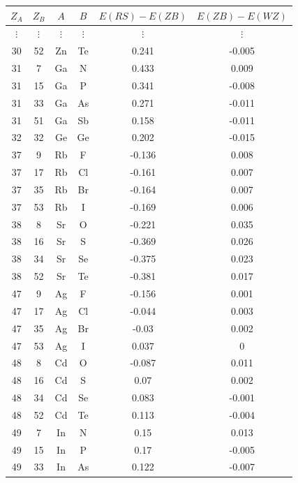 \documentclass[11pt,oneside,czech,american]{book} %
\theoremstyle{plain}
\theoremstyle{definition}
\begin{document}
\begin{table}
\begin{minipage}{0.5\textwidth}
	\end{minipage} \hfill
	\begin{minipage}{0.5\textwidth}
		\begin{tabular}{cccccc}
			\toprule
			$Z_A$ &   $Z_B$ & $A$   & $B$   &      $E(RS) - E(ZB)$ &     $E(ZB)-E(WZ)$ \\
			\midrule
			$\vdots$ & $\vdots$ & $\vdots$ & $\vdots$ & $\vdots$ & $\vdots$  \\ 
			30 &    52 & Zn  & Te  &  0.241 & -0.005 \\
			31 &     7 & Ga  & N   &  0.433 &  0.009 \\
			31 &    15 & Ga  & P   &  0.341 & -0.008 \\
			31 &    33 & Ga  & As  &  0.271 & -0.011 \\
			31 &    51 & Ga  & Sb  &  0.158 & -0.011 \\
			32 &    32 & Ge  & Ge  &  0.202 & -0.015 \\
			37 &     9 & Rb  & F   & -0.136 &  0.008 \\
			37 &    17 & Rb  & Cl  & -0.161 &  0.007 \\
			37 &    35 & Rb  & Br  & -0.164 &  0.007 \\
			37 &    53 & Rb  & I   & -0.169 &  0.006 \\
			38 &     8 & Sr  & O   & -0.221 &  0.035 \\
			38 &    16 & Sr  & S   & -0.369 &  0.026 \\
			38 &    34 & Sr  & Se  & -0.375 &  0.023 \\
			38 &    52 & Sr  & Te  & -0.381 &  0.017 \\
			47 &     9 & Ag  & F   & -0.156 &  0.001 \\
			47 &    17 & Ag  & Cl  & -0.044 &  0.003 \\
			47 &    35 & Ag  & Br  & -0.03  &  0.002 \\
			47 &    53 & Ag  & I   &  0.037 &  0     \\
			48 &     8 & Cd  & O   & -0.087 &  0.011 \\
			48 &    16 & Cd  & S   &  0.07  &  0.002 \\
			48 &    34 & Cd  & Se  &  0.083 & -0.001 \\
			48 &    52 & Cd  & Te  &  0.113 & -0.004 \\
			49 &     7 & In  & N   &  0.15  &  0.013 \\
			49 &    15 & In  & P   &  0.17  & -0.005 \\
			49 &    33 & In  & As  &  0.122 & -0.007 \\

\end{tabular}
\end{minipage}
\end{table}
\end{document}
